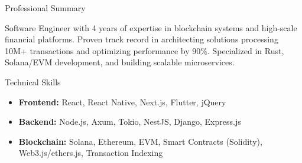 \documentclass[]{mcdowellcv}
\begin{document}
	\makeheader
	
	\begin{cvsection}{Professional Summary}
		\begin{cvsubsection}{}{}{}
      Software Engineer with 4 years of expertise in blockchain systems and high-scale financial platforms. Proven track record in architecting solutions processing 10M+ transactions and optimizing performance by 90\%. Specialized in Rust, Solana/EVM development, and building scalable microservices.
    \end{cvsubsection}
	\end{cvsection}

	\begin{cvsection}{Technical Skills}
		\begin{cvsubsection}{}{}{}	
			\begin{itemize}
        \item \textbf{Frontend:} React, React Native, Next.js, Flutter, jQuery  
        \item \textbf{Backend:} Node.js, Axum, Tokio, NestJS, Django, Express.js  
        \item \textbf{Blockchain:} Solana, Ethereum, EVM, Smart Contracts (Solidity), Web3.js/ethers.js, Transaction Indexing  			
      \end{itemize}
		\end{cvsubsection}
	\end{cvsection}
	
\end{document}
